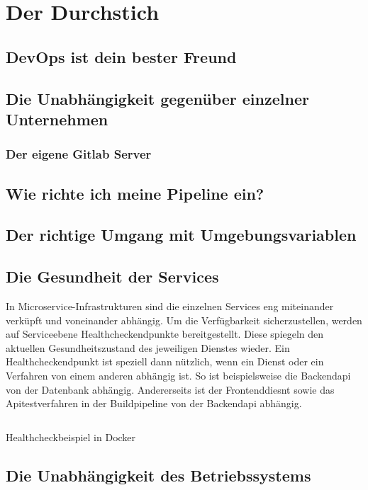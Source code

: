 \chapter{Der Durchstich}

\section{DevOps ist dein bester Freund}

\section{Die Unabhängigkeit gegenüber einzelner Unternehmen}
\subsection{Der eigene Gitlab Server}

\section{Wie richte ich meine Pipeline ein?}

\section{Der richtige Umgang mit Umgebungsvariablen}

\section{Die Gesundheit der Services}
In Microservice-Infrastrukturen sind die einzelnen Services eng miteinander verküpft
und voneinander abhängig. Um die Verfügbarkeit sicherzustellen, werden auf
Serviceebene Healthcheckendpunkte bereitgestellt. Diese spiegeln den aktuellen
Gesundheitszustand des jeweiligen Dienstes wieder. Ein Healthcheckendpunkt
ist speziell dann nützlich, wenn ein Dienst oder ein Verfahren von einem anderen
abhängig ist. So ist beispielsweise die Backendapi von der Datenbank
abhängig. Andererseits ist der Frontenddiesnt sowie das Apitestverfahren
in der Buildpipeline von der Backendapi abhängig. 

\begin{listing}
    \label{lst:healthcheck}
    \inputminted{sh}{snippets/sh/healthcheck.sh}
    \caption{Healthcheckbeispiel in Docker}
\end{listing}

\section{Die Unabhängigkeit des Betriebssystems}
